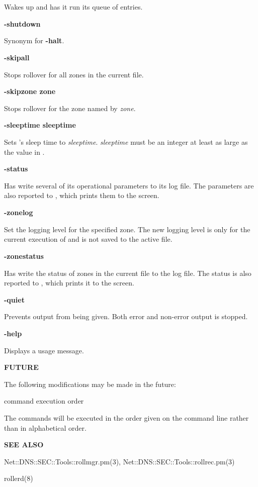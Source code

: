 \begin{description}
Wakes up  and has it run its queue of  entries.

\item {\bf -shutdown}\verb" "

Synonym for {\bf -halt}.

\item {\bf -skipall}\verb" "

Stops rollover for all zones in the current  file.

\item {\bf -skipzone zone}\verb" "

Stops rollover for the zone named by {\it zone}.

\item {\bf -sleeptime sleeptime}\verb" "

Sets 's sleep time to {\it sleeptime}.  {\it sleeptime} must be
an integer at least as large as the  value in .

\item {\bf -status}\verb" "

Has  write several of its operational parameters to its log file.
The parameters are also reported to , which prints them to the
screen.

\item {\bf -zonelog}\verb" "

Set the logging level for the specified zone.  The new logging level is only
for the current execution of  and is not saved to the active
 file.

\item {\bf -zonestatus}\verb" "

Has  write the status of zones in the current  file
to the  log file.  The status is also reported to ,
which prints it to the screen.

\item {\bf -quiet}\verb" "

Prevents output from being given.  Both error and non-error output is stopped.

\item {\bf -help}\verb" "

Displays a usage message.

\end{description}

{\bf FUTURE}

The following modifications may be made in the future:

\begin{description}

\item command execution order\verb" "

The commands will be executed in the order given on the command line rather
than in alphabetical order.

\end{description}

{\bf SEE ALSO}

Net::DNS::SEC::Tools::rollmgr.pm(3),
Net::DNS::SEC::Tools::rollrec.pm(3)

rollerd(8)

